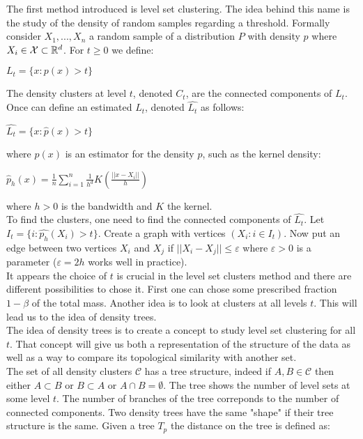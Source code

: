 \documentclass[12pt, a4paper]{article}
\begin{document}
The first method introduced is level set clustering. The idea behind this name is the study of the density of random samples regarding a threshold. Formally consider $X_1, ..., X_n$ a random sample of a distribution $P$ with density $p$ where $X_i \in \mathcal{X} \subset \mathbb{R}^d$. For $t \ge 0$ we define:
  \begin{center}
    $L_t = \lbrace x : p(x) > t \rbrace$
  \end{center}

  The density clusters at level $t$, denoted $C_t$, are the connected components of $L_t$. Once can define an estimated $L_t$, denoted $\hat{L_t}$ as follows:\\
  \begin{center}
    $\widehat{L_t} = \lbrace x : \widehat{p}(x) > t \rbrace $
  \end{center}

  where $\widehat{p}(x)$ is an estimator for the density $p$, such as the kernel density:

  \begin{center}
    $\widehat{p}_h(x) = \frac{1}{n} \sum\limits_{i=1}^n \frac{1}{h^d} K (\frac{||x-X_i||}{h})$
  \end{center}

  where $h > 0$ is the bandwidth and $K$ the kernel.\\

  To find the clusters, one need to find the connected components  of $\widehat{L_t}$. Let $I_t = \lbrace i : \widehat{p_h}(X_i) > t \rbrace$. Create a graph with vertices $(X_i : i \in I_t)$. Now put an edge between two vertices $X_i$ and $X_j$ if $||X_i - X_j|| \le \varepsilon$ where $\varepsilon > 0$ is a parameter ($\varepsilon = 2h$ works well in practice).\\

  It appears the choice of $t$ is crucial in the level set clusters method and there are different possibilities to chose it. First one can chose some prescribed fraction $1-\beta$ of the total mass. Another idea is to look at clusters at all levels $t$. This will lead us to the idea of density trees.\\

  The idea of density trees is to create a concept to study level set clustering for all $t$. That concept will give us both a representation of the structure of the data as well as a way to compare its topological similarity with another set.\\

  The set of all density clusters $\mathcal{C}$ has a tree structure, indeed if $A,B \in \mathcal{C}$ then either $A \subset B$ or $B \subset A$ or $A \cap B = \emptyset$. The tree shows the number of level sets at some level $t$. The number of branches of the tree correponds to the number of connected components. Two density trees have the same "shape" if their tree structure is the same. Given a tree $T_p$ the distance on the tree is defined as: 
\end{document}
